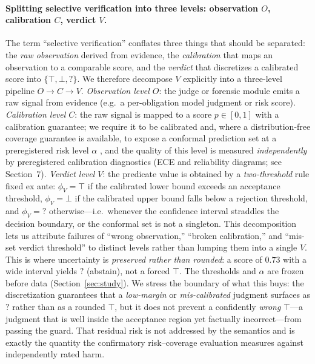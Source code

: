 \documentclass[sigconf,anonymous,review]{acmart}
\begin{document}
\paragraph{Splitting selective verification into three levels: observation $O$, calibration $C$, verdict $V$.} The term ``selective verification'' conflates three things that should be separated: the \emph{raw observation} derived from evidence, the \emph{calibration} that maps an observation to a comparable score, and the \emph{verdict} that discretizes a calibrated score into $\{\top,\bot,?\}$. We therefore decompose $V$ explicitly into a three-level pipeline $O\to C\to V$. \emph{Observation level $O$}: the judge or forensic module emits a raw signal from evidence (e.g.\ a per-obligation model judgment or risk score). \emph{Calibration level $C$}: the raw signal is mapped to a score $p\in[0,1]$ with a calibration guarantee; we require it to be calibrated \cite{guo2017calibration} and, where a distribution-free coverage guarantee is available, to expose a conformal prediction set at a preregistered risk level $\alpha$ \cite{vovk2005algorithmic,angelopoulos2023conformal}, and the quality of this level is measured \emph{independently} by preregistered calibration diagnostics (ECE and reliability diagrams; see Section~7). \emph{Verdict level $V$}: the predicate value is obtained by a \emph{two-threshold} rule fixed ex ante: $\phi_V=\top$ if the calibrated lower bound exceeds an acceptance threshold, $\phi_V=\bot$ if the calibrated upper bound falls below a rejection threshold, and $\phi_V={?}$ otherwise---i.e.\ whenever the confidence interval straddles the decision boundary, or the conformal set is not a singleton. This decomposition lets us attribute failures of ``wrong observation,'' ``broken calibration,'' and ``mis-set verdict threshold'' to distinct levels rather than lumping them into a single $V$. This is where uncertainty is \emph{preserved rather than rounded}: a score of $0.73$ with a wide interval yields $?$ (abstain), not a forced $\top$. The thresholds and $\alpha$ are frozen before data (Section~\ref{sec:study}). We stress the boundary of what this buys: the discretization guarantees that a \emph{low-margin} or \emph{mis-calibrated} judgment surfaces as $?$ rather than as a rounded $\top$, but it does not prevent a confidently \emph{wrong} $\top$---a judgment that is well inside the acceptance region yet factually incorrect---from passing the guard. That residual risk is not addressed by the semantics and is exactly the quantity the confirmatory risk--coverage evaluation measures against independently rated harm.
\end{document}
